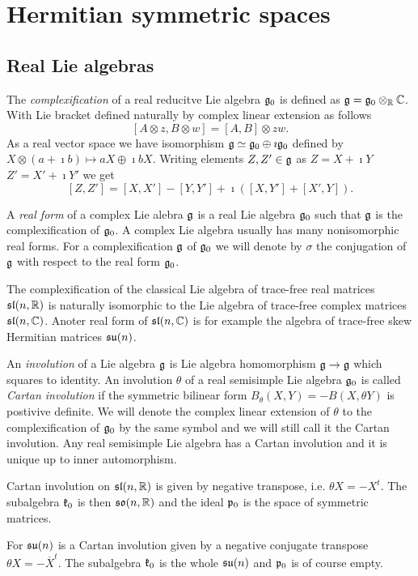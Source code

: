 \chapter{Hermitian symmetric spaces}


\section{Real Lie algebras}

The \emph{complexification} of a real reducitve Lie algebra $\mathfrak{g}_0$ is defined as $\mathfrak{g} = \mathfrak{g}_0\otimes_{\mathbb{R}} \mathbb{C}$. With Lie bracket defined naturally by complex linear extension as follows
\[
 [A\otimes z, B\otimes w] = [A,B]\otimes zw.
\]
As a real vector space we have isomorphism $\mathfrak{g} \simeq \mathfrak{g}_0 \oplus \imath \mathfrak{g}_0$ defined by $X\otimes (a+\imath b) \mapsto aX \oplus \imath bX$. Writing elements $Z,Z'\in\mathfrak{g}$ as $Z = X + \imath Y$ $Z'=X'+\imath Y'$ we get \[[Z,Z'] = [X,X'] - [Y,Y'] + \imath \left( [X,Y'] + [X',Y]\right).\]

A \emph{real form} of a complex Lie alebra $\mathfrak{g}$ is a real Lie algebra $\mathfrak{g}_0$ such that $\mathfrak{g}$ is the complexification of $\mathfrak{g}_0$. A complex Lie algebra usually has many nonisomorphic real forms. For a complexification $\mathfrak{g}$ of $\mathfrak{g}_0$ we will denote by $\sigma$ the conjugation of $\mathfrak{g}$ with respect to the real form $\mathfrak{g}_0$.

\begin{example}
 The complexification of the classical Lie algebra of trace-free real matrices $\mathfrak{sl}(n,\mathbb{R})$ is naturally isomorphic to the Lie algebra of trace-free complex matrices $\mathfrak{sl}(n,\mathbb{C})$. Anoter real form of $\mathfrak{sl}(n,\mathbb{C})$ is for example the algebra of trace-free skew Hermitian  matrices  $\mathfrak{su}(n)$. %
\end{example}

An \emph{involution} of a Lie algebra $\mathfrak{g}$ is Lie algebra homomorphism $\mathfrak{g}\to\mathfrak{g}$ which squares to identity. An involution $\theta$ of a real semisimple Lie algebra $\mathfrak{g}_0$ is called \emph{Cartan involution} if the symmetric bilinear form $B_\theta(X,Y) = -B(X,\theta Y)$ is postivive definite. We will denote the complex linear extension of $\theta$ to the complexification of $\mathfrak{g}_0$ by the same symbol and we will still call it the Cartan involution. Any real semisimple Lie algebra has a Cartan involution and it is unique up to inner automorphism.

\begin{example}
  Cartan involution on $\mathfrak{sl}(n,\mathbb{R})$ is given by negative transpose, i.e. $\theta X = - X^t$. The subalgebra $\mathfrak{k}_0$ is then $\mathfrak{so}(n,\mathbb{R})$ and the ideal $\mathfrak{p}_0$ is the space of symmetric matrices.

 For $\mathfrak{su}(n)$ is a Cartan involution given by a negative conjugate transpose $\theta X = - \overline{X}^t$. The subalgebra $\mathfrak{k}_0$ is the whole $\mathfrak{su}(n)$ and $\mathfrak{p}_0$ is of course empty.
\end{example}

